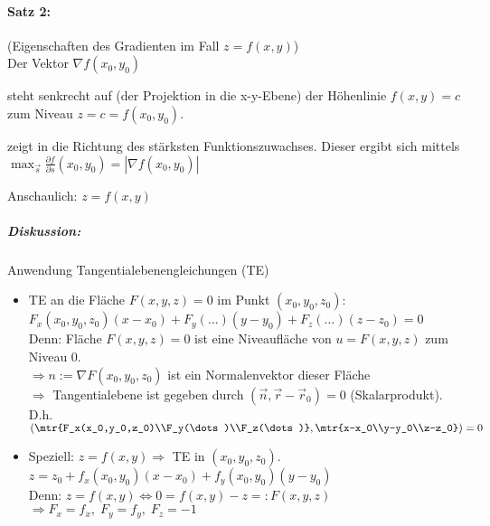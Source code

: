 \paragraph{Satz 2:} (Eigenschaften des Gradienten im Fall $z=f(x,y)$)\\
Der Vektor $\nabla f(x_0,y_0)$
\begin{anumerate}
\item steht senkrecht auf (der Projektion in die x-y-Ebene) der Höhenlinie $f(x,y)=c$ zum Niveau $z=c=f(x_0,y_0)$.
\item zeigt in die Richtung des stärksten Funktionszuwachses. Dieser ergibt sich mittels\\
$\max_{\vec{s}} \frac{\partial f}{\partial s} (x_0,y_0) = | \nabla f(x_0,y_0)|$
\end{anumerate}
Anschaulich: $z=f(x,y)$

\subparagraph{Diskussion:} Anwendung Tangentialebenengleichungen (TE)
\begin{itemize}
\item TE an die Fläche $F(x,y,z) = 0$ im Punkt $(x_0,y_0,z_0)$:\\
$F_x(x_0,y_0,z_0) (x-x_0) + F_y(\dots)(y-y_0) + F_z(\dots)(z-z_0)=0$\\
Denn: Fläche $F(x,y,z)=0$ ist eine Niveaufläche von $u=F(x,y,z)$ zum Niveau $0$.\\
$\Rightarrow n:= \nabla F(x_0,y_0,z_0)$ ist ein Normalenvektor dieser Fläche\\
$\Rightarrow$ Tangentialebene ist gegeben durch $\left(\vec{n}, \vec{r}-\vec{r}_0\right)=0$ (Skalarprodukt).\\
D.h. $\left(\mtr{F_x(x_0,y_0,z_0)\\F_y(\dots)\\F_z(\dots)}, \mtr{x-x_0\\y-y_0\\z-z_0}\right) = 0$
\item Speziell: $z=f(x,y) \Rightarrow$ TE in $(x_0,y_0,z_0)$.\\
$z=z_0+f_x(x_0,y_0)(x-x_0) + f_y(x_0,y_0)(y-y_0)$\\
Denn: $z=f(x,y) \Leftrightarrow 0 = f(x,y) -z =: F(x,y,z)$\\
$\Rightarrow F_x=f_x, \; F_y=f_y,\; F_z = -1$
\end{itemize}

